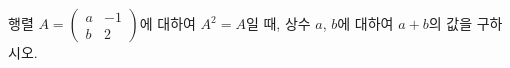 \hspace*{2mm}\begin{minipage}[t]{\dimexpr\linewidth-2mm\relax}\vspace{0pt}
행렬 $A=\begin{pmatrix} a & -1 \\ b & 2 \end{pmatrix}$에 대하여 $A^2=A$일 때, 상수 $a$, $b$에 대하여 $a+b$의 값을 구하시오.\end{minipage}
